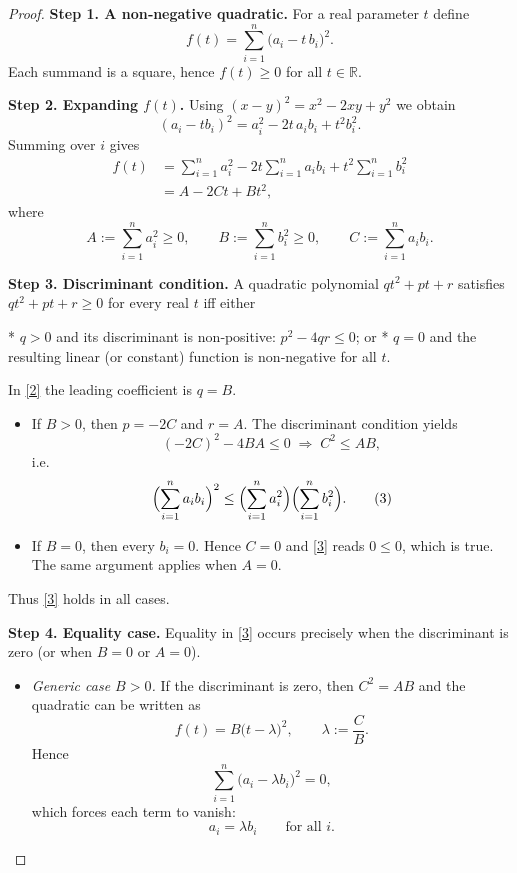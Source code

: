 \begin{proof}
\textbf{Step 1. A non‑negative quadratic.}  
For a real parameter \(t\) define  
\[
f(t)=\sum_{i=1}^{n}\bigl(a_{i}-t\,b_{i}\bigr)^{2}.
\tag{1}
\]
Each summand is a square, hence \(f(t)\ge 0\) for all \(t\in\mathbb{R}\).

\textbf{Step 2. Expanding \(f(t)\).}  
Using \((x-y)^{2}=x^{2}-2xy+y^{2}\) we obtain  
\[
(a_{i}-t b_{i})^{2}=a_{i}^{2}-2t\,a_{i}b_{i}+t^{2}b_{i}^{2}.
\]
Summing over \(i\) gives  
\[
\begin{aligned}
f(t)&=\sum_{i=1}^{n}a_{i}^{2}
      -2t\sum_{i=1}^{n}a_{i}b_{i}
      +t^{2}\sum_{i=1}^{n}b_{i}^{2}   \\
    &=A-2Ct+Bt^{2},
\end{aligned}
\tag{2}
\]
where  
\[
A:=\sum_{i=1}^{n}a_{i}^{2}\ge 0,\qquad
B:=\sum_{i=1}^{n}b_{i}^{2}\ge 0,\qquad
C:=\sum_{i=1}^{n}a_{i}b_{i}.
\]

\textbf{Step 3. Discriminant condition.}  
A quadratic polynomial \(qt^{2}+pt+r\) satisfies \(qt^{2}+pt+r\ge0\) for every real \(t\) iff either  

* \(q>0\) and its discriminant is non‑positive: \(p^{2}-4qr\le0\); or  
* \(q=0\) and the resulting linear (or constant) function is non‑negative for all \(t\).

In \eqref{2} the leading coefficient is \(q=B\).

\begin{itemize}
\item If \(B>0\), then \(p=-2C\) and \(r=A\). The discriminant condition yields  
\[
(-2C)^{2}-4BA\le0\;\Longrightarrow\;C^{2}\le AB,
\]
i.e.  
\[
\Bigl(\sum_{i=1}^{n}a_{i}b_{i}\Bigr)^{2}
\le
\Bigl(\sum_{i=1}^{n}a_{i}^{2}\Bigr)
\Bigl(\sum_{i=1}^{n}b_{i}^{2}\Bigr).
\tag{3}
\]

\item If \(B=0\), then every \(b_{i}=0\). Hence \(C=0\) and \eqref{3} reads \(0\le0\), which is true. The same argument applies when \(A=0\).
\end{itemize}
Thus \eqref{3} holds in all cases.

\textbf{Step 4. Equality case.}  
Equality in \eqref{3} occurs precisely when the discriminant is zero (or when \(B=0\) or \(A=0\)).

\begin{itemize}
\item \emph{Generic case \(B>0\).}  
If the discriminant is zero, then \(C^{2}=AB\) and the quadratic can be written as  
\[
f(t)=B\bigl(t-\lambda\bigr)^{2},\qquad \lambda:=\frac{C}{B}.
\]
Hence
\[
\sum_{i=1}^{n}\bigl(a_{i}-\lambda b_{i}\bigr)^{2}=0,
\]
which forces each term to vanish:
\[
a_{i}=\lambda b_{i}\qquad\text{for all }i.
\]


\end{itemize}
\end{proof}
